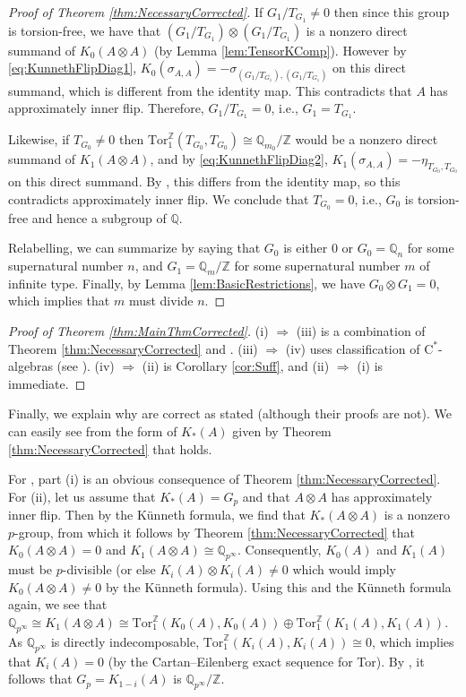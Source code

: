 \documentclass[a4paper,10pt]{amsart}
\newcommand{\cstar}{\ensuremath{\mathrm C^\ast}}
\numberwithin{equation}{section}
\numberwithin{theorem}{section}
\newcommand{\Q}{\mathbb{Q}}
\newcommand{\Z}{\mathbb{Z}}
\newcommand{\Tor}{\mathrm{Tor}_1^{\Z}}
\begin{document}
\begin{proof}[Proof of Theorem \ref{thm:NecessaryCorrected}]
If $G_1/T_{G_1} \neq 0$ then since this group is torsion-free, we have that $(G_1/T_{G_1}) \otimes (G_1/T_{G_1})$ is a nonzero direct summand of $K_0(A\otimes A)$ (by Lemma \ref{lem:TensorKComp}).
However by \eqref{eq:KunnethFlipDiag1}, $K_0(\sigma_{A,A}) = -\sigma_{(G_1/T_{G_1}),(G_1/T_{G_1})}$ on this direct summand, which is different from the identity map.
This contradicts that $A$ has approximately inner flip.
Therefore, $G_1/T_{G_1} = 0$, i.e., $G_1=T_{G_1}$.

Likewise, if $T_{G_0} \neq 0$ then $\Tor(T_{G_0},T_{G_0}) \cong \Q_{m_0}/\Z$ would be a nonzero direct summand of $K_1(A\otimes A)$, and by \eqref{eq:KunnethFlipDiag2}, $K_1(\sigma_{A,A}) = -\eta_{T_{G_0},T_{G_0}}$ on this direct summand.
By \cite[Proposition 5.1]{aifK}, this differs from the identity map, so this contradicts approximately inner flip.
We conclude that $T_{G_0}=0$, i.e., $G_0$ is torsion-free and hence a subgroup of $\Q$.

Relabelling, we can summarize by saying that $G_0$ is either $0$ or $G_0=\Q_n$ for some supernatural number $n$, and $G_1=\Q_m/\Z$ for some supernatural number $m$ of infinite type.
Finally, by Lemma \ref{lem:BasicRestrictions}, we have $G_0\otimes G_1=0$, which implies that $m$ must divide $n$.
\end{proof}

\begin{proof}[Proof of Theorem \ref{thm:MainThmCorrected}]
(i) $\Rightarrow$ (iii) is a combination of Theorem \ref{thm:NecessaryCorrected} and \cite[Propositions 2.7, 2.8, 2.10]{EffrosRosenberg}.
(iii) $\Rightarrow$ (iv) uses classification of $\cstar$-algebras (see \cite[Remark 2.1]{aifK}).
(iv) $\Rightarrow$ (ii) is Corollary \ref{cor:Suff}, and (ii) $\Rightarrow$ (i) is immediate.
\end{proof}

Finally, we explain why \cite[Lemmas 6.2 and 6.4]{aifK} are correct as stated (although their proofs are not).
We can easily see from the form of $K_*(A)$ given by Theorem \ref{thm:NecessaryCorrected} that \cite[Lemma 6.2]{aifK} holds.

For \cite[Lemma 6.4]{aifK}, part (i) is an obvious consequence of Theorem \ref{thm:NecessaryCorrected}.
For (ii), let us assume that $K_*(A) = G_p$ and that $A\otimes A$ has approximately inner flip.
Then by the K\"unneth formula, we find that $K_*(A\otimes A)$ is a nonzero $p$-group, from which it follows by Theorem \ref{thm:NecessaryCorrected} that $K_0(A\otimes A)=0$ and $K_1(A\otimes A)\cong \Q_{p^\infty}$.
Consequently, $K_0(A)$ and $K_1(A)$ must be $p$-divisible (or else $K_i(A)\otimes K_i(A)\neq 0$ which would imply $K_0(A\otimes A)\neq 0$ by the K\"unneth formula).
Using this and the K\"unneth formula again, we see that $\Q_{p^\infty} \cong K_1(A\otimes A)\cong \Tor(K_0(A),K_0(A))\oplus \Tor(K_1(A),K_1(A))$.
As $\Q_{p^\infty}$ is directly indecomposable, $\Tor(K_i(A),K_i(A))\cong 0$, which implies that $K_i(A)=0$ (by the Cartan--Eilenberg exact sequence for Tor).
By \cite[Corollary 27.4]{Fuchs}, it follows that $G_p=K_{1-i}(A)$ is $\Q_{p^\infty}/\Z$.
\end{document}
